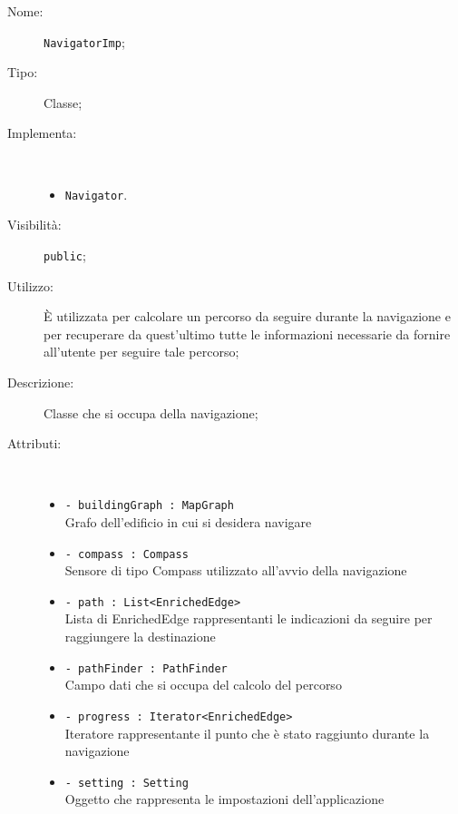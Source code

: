 \documentclass[../DefinizioneDiProdotto.tex]{subfiles}
\begin{document}
\begin{description}
	\item[Nome:] \texttt{NavigatorImp};
	\item[Tipo:] Classe;
	\item[Implementa:] \
	\begin{itemize}
		\item \texttt{Navigator}.
		
	\end{itemize}
	\item[Visibilità:] \texttt{public};
	\item[Utilizzo:] È utilizzata per calcolare un percorso da seguire durante la navigazione e per recuperare da quest'ultimo tutte le informazioni necessarie da fornire all'utente per seguire tale percorso;
	\item[Descrizione:] Classe che si occupa della navigazione;
	\item[Attributi:] \
	\begin{itemize}
		\item \texttt{- buildingGraph : MapGraph}\\
		Grafo dell'edificio in cui si desidera navigare
		
		\item \texttt{- compass : Compass}\\
		Sensore di tipo Compass utilizzato all'avvio della navigazione
		
		\item \texttt{- path : List<EnrichedEdge>}\\
		Lista di EnrichedEdge rappresentanti le indicazioni da seguire per raggiungere la destinazione
		
		\item \texttt{- pathFinder : PathFinder}\\
		Campo dati che si occupa del calcolo del percorso
		
		\item \texttt{- progress : Iterator<EnrichedEdge>}\\
		Iteratore rappresentante il punto che è stato raggiunto durante la navigazione
		
		\item \texttt{- setting : Setting}\\
		Oggetto che rappresenta le impostazioni dell'applicazione
		

\end{itemize}
\end{description}
\end{document}
